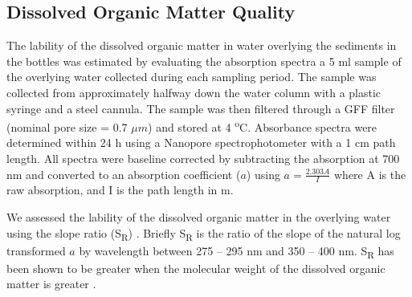 \subsection{Dissolved Organic Matter Quality}

The lability of the dissolved organic matter in water overlying the sediments in the bottles was estimated by evaluating the absorption spectra a 5 ml sample of the overlying water collected during each sampling period. The sample was collected from approximately halfway down the water column with a plastic syringe and a steel cannula. The sample was then filtered through a GFF filter (nominal pore size = 0.7 $\mu m$) and stored at 4 \textsuperscript{o}C. Absorbance spectra were determined within 24 h using a Nanopore spectrophotometer with a 1 cm path length. All spectra were baseline corrected by subtracting the absorption at 700 nm and converted to an absorption coefficient ($a$) using $a = \frac{2.303A}{I}$ where A is the raw absorption, and I is the path length in m.

We assessed the lability of the dissolved organic matter in the overlying water using the slope ratio (S\textsubscript{R}) \cite{helmsetal2008}. Briefly S\textsubscript{R} is the ratio of the slope of the natural log transformed $a$ by wavelength between 275 -- 295 nm and 350 -- 400 nm. S\textsubscript{R} has been shown to be greater when the molecular weight of the dissolved organic matter is greater \cite{helmsetal2008}. 

  